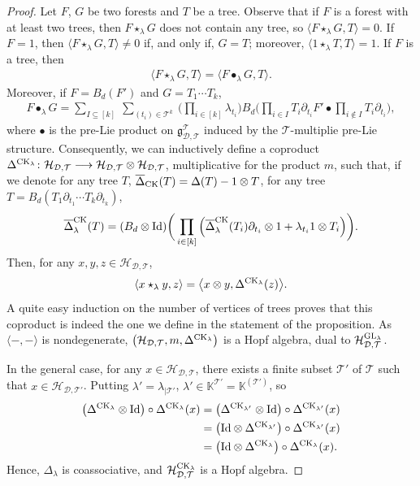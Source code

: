 \documentclass[pdftex]{sigma}
\numberwithin{equation}{section}
\newcommand{\K}{\mathbb{K}}
\newcommand{\T}{\mathcal{T}}
\newcommand{\D}{\mathcal{D}}
\newcommand{\g}{\mathfrak{g}}
\newcommand{\h}{\mathcal{H}}
\newcommand{\id}{\mathrm{Id}}
\begin{document}
\begin{proof}
Let $F$, $G$ be two forests and $T$ be a tree. Observe that if $F$ is a forest with at least two trees,
then $F\star_\lambda G$ does not contain any tree, so $\langle F\star_\lambda G,T\rangle=0$.
If $F=1$, then $\langle F\star_\lambda G,T\rangle\neq 0$ if, and only if, $G=T$; moreover, $\langle 1\star_\lambda T,T\rangle=1$.
If $F$ is a tree, then
\begin{gather*}
\langle F\star_\lambda G,T\rangle=\langle F\bullet_\lambda G,T\rangle.
\end{gather*}
Moreover, if $F=B_d(F')$ and $G=T_1\cdots T_k$,
\begin{gather*}
F\bullet_\lambda G=\sum_{I\subseteq [k]}\: \sum_{(t_i)\in \T^k}\:
\bigg(\prod_{i\in [k]} \lambda_{t_i}\bigg) B_d\bigg(\prod_{i\in I} T_i\partial_{t_i}
F'\bullet \prod_{i\notin I} T_i\partial_{t_i}\bigg),
\end{gather*}
where $\bullet$ is the pre-Lie product on $\g_{\D,\T}^\T$ induced by the $\T$-multiplie pre-Lie structure.
Consequently, we can inductively define a coproduct $\Delta^{{\rm CK}_\lambda}\colon \h_{\D,\T}\longrightarrow
\h_{\D,\T}\otimes \h_{\D,\T}$,
multiplicative for the product $m$, such that, if we denote for any tree $T$,
$\overline{\Delta}_{{\rm CK}}(T)=\Delta(T)-1\otimes T$,
for any tree $T=B_d(T_1\partial_{t_1}\cdots T_k\partial_{t_k})$,
\begin{gather*}
\overline{\Delta}^{{\rm CK}}_\lambda(T)=(B_d\otimes \id)\bigg(\prod_{i\in [k]}
\Big(\overline{\Delta}_\lambda^{{\rm CK}}(T_i)\partial_{t_i}\otimes 1+\lambda_{t_i}1\otimes T_i\Big)\bigg).
\end{gather*}
Then, for any $x,y,z\in \h_{\D,\T}$,
\begin{gather*}
\langle x\star_\lambda y,z\rangle=\big\langle x\otimes y,\Delta^{{\rm CK}_\lambda}(z)\big\rangle.
\end{gather*}
A quite easy induction on the number of vertices of trees proves that this coproduct is indeed
the one we define in the statement of the proposition. As $\langle-,-\rangle$ is nondegenerate,
$\big(\h_{\D,\T},m,\Delta^{{\rm CK}_\lambda}\big)$ is a Hopf algebra, dual to $\h_{\D,\T}^{{\rm GL}_\lambda}$.

In the general case, for any $x\in \h_{\D,\T}$, there exists a finite subset $\T'$ of $\T$ such that
$x\in \h_{\D,\T'}$. Putting $\lambda'=\lambda_{\mid \T'}$, $\lambda'\in \K^{\T'}=\K^{(\T')}$, so
\begin{align*}
\big(\Delta^{{\rm CK}_\lambda}\otimes \id\big)\circ \Delta^{{\rm CK}_\lambda}(x)
&=\big(\Delta^{{\rm CK}_{\lambda'}}\otimes \id\big)\circ \Delta^{{\rm CK}_{\lambda'}}(x)\\
&=\big(\id \otimes \Delta^{{\rm CK}_{\lambda'}}\big)\circ \Delta^{{\rm CK}_{\lambda'}}(x)\\
&=\big(\id \otimes \Delta^{{\rm CK}_\lambda}\big)\circ \Delta^{{\rm CK}_\lambda}(x).
\end{align*}
Hence, $\Delta_\lambda$ is coassociative, and $\h_{\D,\T}^{{\rm CK}_\lambda}$ is a Hopf algebra. \end{proof}
\end{document}
